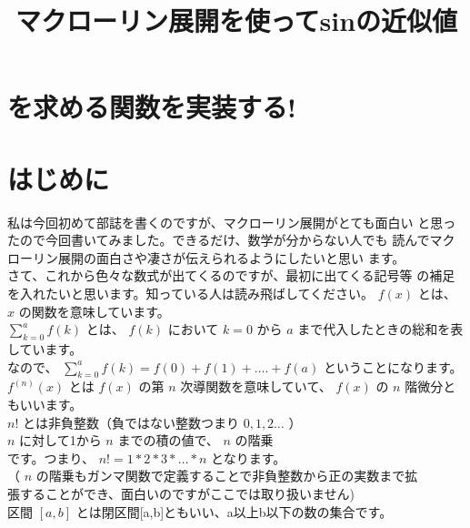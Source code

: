 \documentclass[10pt]{article}
\title{マクローリン展開を使ってsinの近似値 }
\author{}
\date{}
\begin{document}
\maketitle
\section*{を求める関数を実装する!}
\section*{はじめに}
私は今回初めて部誌を書くのですが、マクローリン展開がとても面白い と思ったので今回書いてみました。できるだけ、数学が分からない人でも 読んでマクローリン展開の面白さや凄さが伝えられるようにしたいと思い ます。\\
さて、これから色々な数式が出てくるのですが、最初に出てくる記号等 の補足を入れたいと思います。知っている人は読み飛ばしてください。 $f(x)$ とは、 $x$ の関数を意味しています。\\
$\sum_{k=0}^{a} f(k)$ とは、 $f(k)$ において $k=0$ から $a$ まで代入したときの総和を表しています。\\
なので、 $\sum_{k=0}^{a} f(k)=f(0)+f(1)+\ldots .+f(a)$ ということになります。\\
$f^{(n)}(x)$ とは $f(x)$ の第 $n$ 次導関数を意味していて、 $f(x)$ の $n$ 階微分ともいいます。\\
$n!$ とは非負整数（負ではない整数つまり $0,1,2 \ldots$ ）\\
$n$ に対して1から $n$ までの積の値で、 $n$ の階乗\\
です。つまり、 $n!=1 * 2 * 3 * \ldots * n$ となります。\\
（ $n$ の階乗もガンマ関数で定義することで非負整数から正の実数まで拡\\
張することができ、面白いのですがここでは取り扱いません)\\
区間 $[a, b]$ とは閉区間[a,b]ともいい、a以上b以下の数の集合です。
\end{document}

